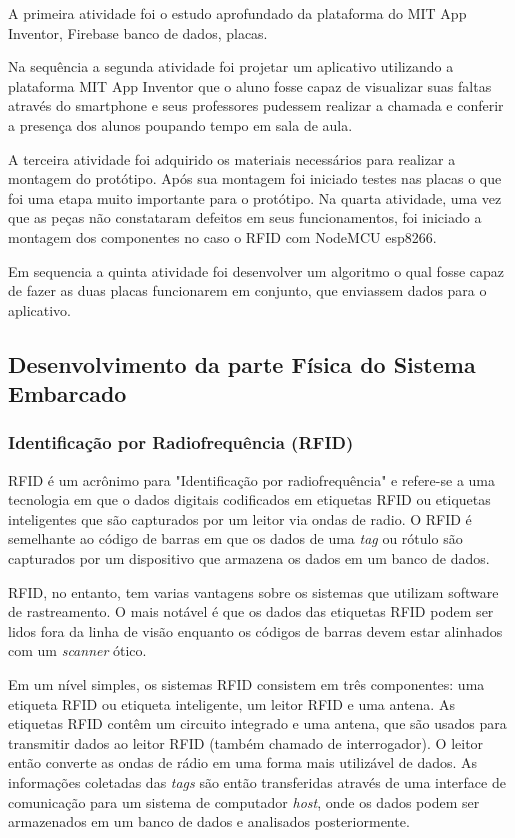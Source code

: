 \documentclass[12pt]{article}
\begin{document}
A primeira atividade foi o estudo aprofundado da plataforma do MIT App Inventor, Firebase banco de dados, placas.


Na sequência a segunda atividade foi projetar um aplicativo utilizando a plataforma MIT App Inventor que o aluno fosse capaz de visualizar suas faltas através do smartphone e seus professores pudessem realizar a chamada e conferir a presença dos alunos poupando tempo em sala de aula.

A terceira atividade foi adquirido os materiais necessários para realizar a montagem do protótipo. Após sua montagem foi iniciado testes nas placas o que foi uma etapa muito importante para o protótipo. 
Na quarta atividade, uma vez que as peças não constataram defeitos em seus funcionamentos, foi iniciado a montagem dos componentes no caso o RFID com NodeMCU esp8266.

Em sequencia a quinta atividade foi desenvolver um algoritmo o qual fosse capaz de fazer as duas placas funcionarem em conjunto, que enviassem dados para o aplicativo.



%
%
%

\subsection{Desenvolvimento da parte Física do Sistema Embarcado}

\subsubsection{Identificação por Radiofrequência (RFID)}
RFID é um acrônimo para "Identificação por radiofrequência" e refere-se a uma tecnologia em que o dados digitais codificados em etiquetas RFID ou etiquetas inteligentes que são capturados por um leitor via ondas de radio. O RFID é semelhante ao código de barras em que os dados de uma \textit{tag} ou rótulo são capturados por um dispositivo que armazena os dados em um banco de dados. 

RFID, no entanto, tem varias vantagens sobre os sistemas que utilizam software de rastreamento. O mais notável é que os dados das etiquetas RFID podem ser lidos fora da linha de visão enquanto os códigos de barras devem estar alinhados com um \textit{scanner} ótico.

Em um nível simples, os sistemas RFID consistem em três componentes: uma etiqueta RFID ou etiqueta inteligente, um leitor RFID e uma antena. As etiquetas RFID contêm um circuito integrado e uma antena, que são usados para transmitir dados ao leitor RFID (também chamado de interrogador). O leitor então converte as ondas de rádio em uma forma mais utilizável de dados. As informações coletadas das \textit{tags} são então transferidas através de uma interface de comunicação para um sistema de computador \textit{host}, onde os dados podem ser armazenados em um banco de dados e analisados posteriormente.
\end{document}
